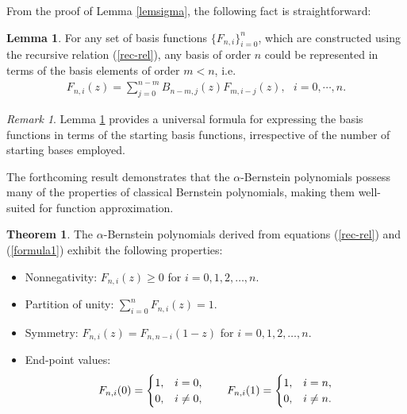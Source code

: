 \documentclass[preprint,12pt]{elsarticle}
\theoremstyle{definition}
\theoremstyle{theorem}
\newtheorem{theorem}{Theorem}
\theoremstyle{lemma}
\newtheorem{lemma}{Lemma}
\theoremstyle{example}
\theoremstyle{remark}
\newtheorem{remark}{Remark}
\theoremstyle{prop}
\begin{document}
From the proof of Lemma \ref{lemsigma}, the following fact is straightforward:

\begin{lemma} \label{rec-lem}
For any set of basis functions $\{F_{n,i}\}_{i=0}^n$, which are constructed using the recursive relation (\ref{rec-rel}), any basis of order $n$ could be represented in terms of the basis elements of order $m <n$, i.e.
\begin{eqnarray} \label{sigma}
F_{n,i}(z) =\sum_{j=0}^{n-m}B_{n-m,j}(z)F_{m,i-j}(z), ~~~ i=0,\cdots, n.
\end{eqnarray}

\end{lemma}

\begin{remark}
 Lemma \ref{rec-lem} provides a universal formula for expressing the basis functions in terms of  the starting basis functions, irrespective of the number of starting bases employed.
\end{remark}









The forthcoming result demonstrates that the $\alpha$-Bernstein polynomials possess many of the properties of classical Bernstein polynomials, making them well-suited for function approximation.

\begin{theorem}\label{thm1} 
The $\alpha$-Bernstein polynomials  derived from equations  (\ref{rec-rel}) and (\ref{formula1}) exhibit the following  properties:
\begin{itemize}
\item [\rm{(a)}] Nonnegativity: $ F_{n,i}(z) \geq 0$  for $ i = 0, 1, 2,\ldots , n$.
\item [\rm{(b)}] Partition of unity: $ \sum_{i=0}^{n}F_{n,i}(z)=1 $.
\item [\rm{(c)}] Symmetry: $ F_{n,i}(z)=F_{n,n-i}(1-z) $ for $ i = 0, 1, 2, \ldots , n $. 
\item [\rm{(d)}] End-point values:
\begin{eqnarray}
F_{n,i}(0)= 
\begin{cases} 
1, & i=0,
\\ 
0, & i\neq 0,
\end{cases}
\hspace{0.7cm}
F_{n,i}(1)= 
\begin{cases} 
1, & i=n,
\\ 
0, & i\neq n.
\end{cases}
\label{end-val}
\end{eqnarray}
\end{itemize}
\end{theorem}
\end{document}
